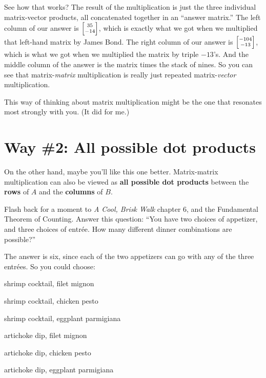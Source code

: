 See how that works? The result of the multiplication is just the three
individual matrix-vector products, all concatenated together in an ``answer
matrix.'' The left column of our answer is ${\scriptsize \begin{bmatrix} 35 \\
-14 \\ \end{bmatrix}}$, which is exactly what we got when we multiplied that
left-hand matrix by James Bond. The right column of our answer is ${\scriptsize
\begin{bmatrix} -104 \\ -13 \\ \end{bmatrix}}$, which is what we got when we
multiplied the matrix by triple $-13$'s. And the middle column of the answer is
the matrix times the stack of nines. So you can see that matrix-\textit{matrix}
multiplication is really just repeated matrix-\textit{vector} multiplication.

This way of thinking about matrix multiplication might be the one that
resonates most strongly with you. (It did for me.)

\section{Way \#2: All possible dot products}

\label{matMultWay2}

On the other hand, maybe you'll like this one better. Matrix-matrix
multiplication can also be viewed as \textbf{all possible dot products} between
the \textbf{rows} of $A$ and the \textbf{columns} of $B$.

Flash back for a moment to \textit{A Cool, Brisk Walk} chapter 6, and the
Fundamental Theorem of Counting. Answer this question: ``You have two choices
of appetizer, and three choices of entr\'{e}e. How many different dinner
combinations are possible?''

The answer is six, since each of the two appetizers can go with any of the
three entr\'{e}es. So you could choose:

\begin{compactenum}
\item shrimp cocktail, filet mignon
\item shrimp cocktail, chicken pesto
\item shrimp cocktail, eggplant parmigiana
\item artichoke dip, filet mignon
\item artichoke dip, chicken pesto
\item artichoke dip, eggplant parmigiana
\end{compactenum}

